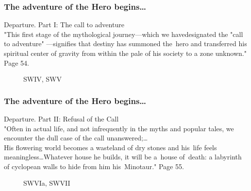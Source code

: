 \documentclass[10pt,t]{beamer}
\begin{document}
\begin{frame}
  \frametitle{The adventure of the Hero begins\ldots}


  Departure. Part I: The call to adventure \\
  "This first stage of the mythological journey—which we
  havedesignated the "call to adventure" —signifies that destiny has
  summoned the~hero and transferred his spiritual center of gravity
  from within the pale of his society to a zone unknown." Page 54.


  \begin{figure}

    \centering


    SWIV, SWV

  \end{figure}

\end{frame}





\begin{frame}
  \frametitle{The adventure of the Hero begins\ldots}


  Departure. Part II: Refusal of the Call \\
  "Often in actual life, and not infrequently in the myths and
  popular tales, we encounter the dull case of the call unanswered;\ldots \\
  His flowering world becomes a wasteland of dry stones and his~life
  feels meaningless\ldots Whatever house he builds, it will be
  a~house of~death: a labyrinth of cyclopean walls to hide from him
  his~Minotaur." Page 55.


  \begin{figure}

    \centering


    SWVIa, SWVII

  \end{figure}

\end{frame}
\end{document}
